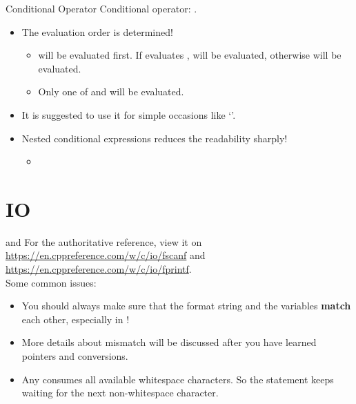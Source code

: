 \documentclass[handout]{beamer}
\begin{document}
\begin{frame}{Conditional Operator}
    Conditional operator: .
    \begin{itemize}
        \item The evaluation order is determined!
        \pause
        \begin{itemize}
            \item {} will be evaluated first. If  evaluates ,  will be evaluated, otherwise  will be evaluated.
            \item Only one of  and  will be evaluated.
        \end{itemize}
        \pause
        \item It is suggested to use it for simple occasions like `'.
        \item Nested conditional expressions reduces the readability sharply!
        \begin{itemize}
            \item {}
        \end{itemize}
    \end{itemize}
\end{frame}

\section{IO}

\begin{frame}{ and }
    For the authoritative reference, view it on \url{https://en.cppreference.com/w/c/io/fscanf} and \url{https://en.cppreference.com/w/c/io/fprintf}.\\
    \pause
    Some common issues:
    \begin{itemize}
        \item You should always make sure that the format string and the variables \textbf{match} each other, especially in !
        \item More details about mismatch will be discussed after you have learned pointers and conversions.
        \pause
        \item Any  consumes all available  whitespace characters. So the statement  keeps waiting for the next non-whitespace character.
    \end{itemize}
\end{frame}
\end{document}

